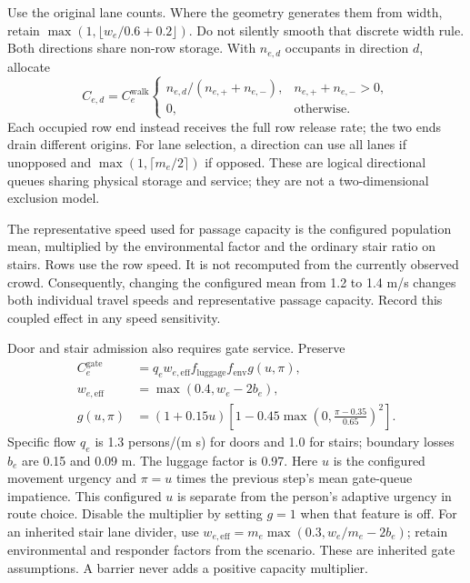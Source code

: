 \documentclass[11pt,a4paper]{article}
\begin{document}
Use the original lane counts. Where the geometry generates them from width, retain $\max(1,\lfloor w_e/0.6+0.2\rfloor)$. Do not silently smooth that discrete width rule. Both directions share non-row storage. With $n_{e,d}$ occupants in direction $d$, allocate
\begin{equation}
 C_{e,d}=C_e^{\mathrm{walk}}\begin{cases}
 n_{e,d}/(n_{e,+}+n_{e,-}), & n_{e,+}+n_{e,-}>0,\\
 0, & \text{otherwise}.
 \end{cases}
\label{impl:direction}
\end{equation}
Each occupied row end instead receives the full row release rate; the two ends drain different origins. For lane selection, a direction can use all lanes if unopposed and $\max(1,\lceil m_e/2\rceil)$ if opposed. These are logical directional queues sharing physical storage and service; they are not a two-dimensional exclusion model.

The representative speed used for passage capacity is the configured population mean, multiplied by the environmental factor and the ordinary stair ratio on stairs. Rows use the row speed. It is not recomputed from the currently observed crowd. Consequently, changing the configured mean from 1.2 to 1.4 m/s changes both individual travel speeds and representative passage capacity. Record this coupled effect in any speed sensitivity.

Door and stair admission also requires gate service. Preserve
\begin{align}\label{impl:eq9}
 C_e^{\mathrm{gate}}&=q_ew_{e,\mathrm{eff}}f_{\mathrm{luggage}}f_{\mathrm{env}}g(u,\pi),\\
 w_{e,\mathrm{eff}}&=\max(0.4,w_e-2b_e),\\
 g(u,\pi)&=(1+0.15u)\left[1-0.45\max\!\left(0,\frac{\pi-0.35}{0.65}\right)^2\right].
\end{align}
Specific flow $q_e$ is 1.3 persons/(m s) for doors and 1.0 for stairs; boundary losses $b_e$ are 0.15 and 0.09 m. The luggage factor is 0.97. Here $u$ is the configured movement urgency and $\pi=u$ times the previous step's mean gate-queue impatience. This configured $u$ is separate from the person's adaptive urgency in route choice. Disable the multiplier by setting $g=1$ when that feature is off. For an inherited stair lane divider, use $w_{e,\mathrm{eff}}=m_e\max(0.3,w_e/m_e-2b_e)$; retain environmental and responder factors from the scenario. These are inherited gate assumptions. A barrier never adds a positive capacity multiplier.
\end{document}
